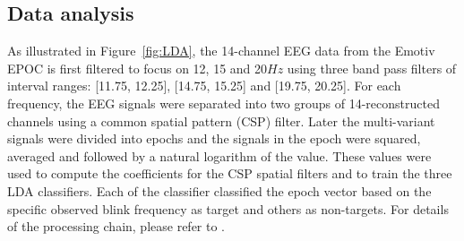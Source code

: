 \documentclass{svmult}
\begin{document}
\subsection{Data analysis}
As illustrated in Figure~\ref{fig:LDA}, the 14-channel EEG data from the Emotiv EPOC is first filtered to focus on 12, 15 and 20$Hz$ using three band pass filters of interval ranges: [11.75, 12.25], [14.75, 15.25] and [19.75, 20.25]. For each frequency, the EEG signals were separated into two groups of 14-reconstructed channels using a common spatial pattern (CSP) filter. Later the multi-variant signals were divided into epochs and the signals in the epoch were squared, averaged and followed by a natural logarithm of the value. These values were used to compute the coefficients for the CSP spatial filters and to train the three LDA classifiers. Each of the classifier classified the epoch vector based on the specific observed blink frequency as target and others as non-targets. For details of the processing chain, please refer to \cite{openvibeSSVEP}. 
\end{document}
